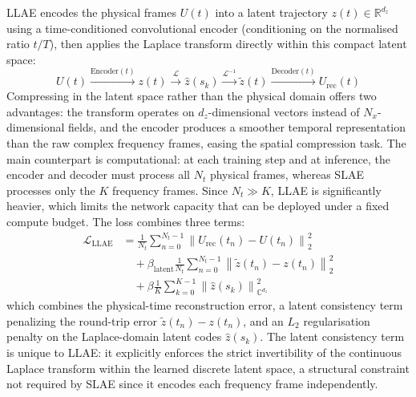 ﻿\documentclass[a4paper,12pt]{article}
\theoremstyle{definition}
\theoremstyle{remark}
\newcommand{\C}{\mathbb{C}}
\newcommand{\R}{\mathbb{R}}
\begin{document}
LLAE encodes the physical frames $U(t)$ into a latent trajectory $z(t) \in \R^{d_z}$ using a time-conditioned convolutional encoder (conditioning on the normalised ratio $t/T$), then applies the Laplace transform directly within this compact latent space:
\begin{equation}
    U(t) \xrightarrow{\text{Encoder}(t)} z(t) \xrightarrow{\mathcal{L}} \hat{z}(s_k) \xrightarrow{\mathcal{L}^{-1}} \tilde{z}(t) \xrightarrow{\text{Decoder}(t)} U_{\text{rec}}(t)
\end{equation}
Compressing in the latent space rather than the physical domain offers two advantages: the transform operates on $d_z$-dimensional vectors instead of $N_x$-dimensional fields, and the encoder produces a smoother temporal representation than the raw complex frequency frames, easing the spatial compression task. The main counterpart is computational: at each training step and at inference, the encoder and decoder must process all $N_t$ physical frames, whereas SLAE processes only the $K$ frequency frames. Since $N_t \gg K$, LLAE is significantly heavier, which limits the network capacity that can be deployed under a fixed compute budget. The loss combines three terms:
\begin{equation}
\label{eq:llae_loss}
\begin{aligned}
    \mathcal{L}_{\mathrm{LLAE}} &= \frac{1}{N_t}\sum_{n=0}^{N_t-1} \left\| U_{\mathrm{rec}}(t_n) - U(t_n) \right\|_2^2 \\
    &\quad + \beta_{\mathrm{latent}} \frac{1}{N_t}\sum_{n=0}^{N_t-1} \left\| \tilde{z}(t_n) - z(t_n) \right\|_2^2 \\
    &\quad + \beta \frac{1}{K}\sum_{k=0}^{K-1} \left\| \hat{z}(s_k) \right\|_{\C^{d_z}}^2
\end{aligned}
\end{equation}
which combines the physical-time reconstruction error, a latent consistency term penalizing the round-trip error $\tilde{z}(t_n) - z(t_n)$, and an $L_2$ regularisation penalty on the Laplace-domain latent codes $\hat{z}(s_k)$. The latent consistency term is unique to LLAE: it explicitly enforces the strict invertibility of the continuous Laplace transform within the learned discrete latent space, a structural constraint not required by SLAE since it encodes each frequency frame independently.
\end{document}
